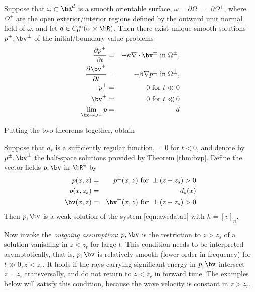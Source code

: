 \begin{thm} \label{thm:bvp}
Suppose that $\omega \subset \bR^d$ is a smooth orientable surface, $\omega = \partial  \Omega^- = \partial \Omega^+$, where $\Omega^{\pm}$ are the open exterior/interior regions defined by the outward unit normal field of $\omega$, and let $d \in C^{\infty}_0(\omega \times \bR)$. Then there exist unique smooth solutions $p^{\pm},\bv^{\pm}$ of the initial/boundary value problems 
\begin{eqnarray}
\label{eqn:awebdry}
\frac{\partial p^{\pm}}{\partial t} & = & - \kappa \nabla \cdot \bv^{\pm} \mbox{ in } \Omega^{\pm}, \nonumber \\
\frac{\partial \bv^{\pm}}{\partial t} & = & - \beta \nabla p^{\pm} \mbox{ in } \Omega^{\pm},\nonumber \\
p^{\pm} & =& 0 \mbox{ for } t \ll 0\nonumber\\ 
\bv^{\pm} & = & 0 \mbox{ for } t \ll 0 \nonumber\\
\lim_{\bx \rightarrow \omega^{\pm}}p & = & d 
\end{eqnarray}
\end{thm}


Putting the two theorems together, obtain
\begin{cor}\label{thm:bvps}
Suppose that $d_s$ is a sufficiently regular function, = 0 for $t<0$, and denote by $p^{\pm},\bv^{\pm}$ the half-space solutions provided by Theorem \ref{thm:bvp}. Define the vector fields $p,\bv$ in $\bR^4$ by
\begin{eqnarray}
\label{eqn:putemtogether} 
p(x,z) &=& p^{\pm}(x,z) \mbox{ for } \pm(z-z_s) > 0\\
p(x,z_s)&=&d_s(x)\\
\bv(x,z) &=& \bv^{\pm}(x,z) \mbox{ for } \pm(z-z_s) > 0\\
\end{eqnarray}
Then $p,\bv$ is a weak solution of the system \ref{eqn:awedata1} with $h=[v]_n$.
\end{cor}

Now invoke the {\em outgoing assumption}: $p,\bv$ is the restriction to $z>z_s$ of a solution vanishing in $z<z_r$ for large $t$. This condition needs to be interpreted asymptotically, that is, $p,\bv$ is relatively smooth (lower order in frequency) for $t \gg 0, z<z_r$. It holds if the rays carrying significant energy in $p,\bv$ intersect $z=z_r$ transversally, and do not return to $z<z_r$ in forward time. The examples below will satisfy this condition, because the wave velocity is constant in $z > z_r$.

